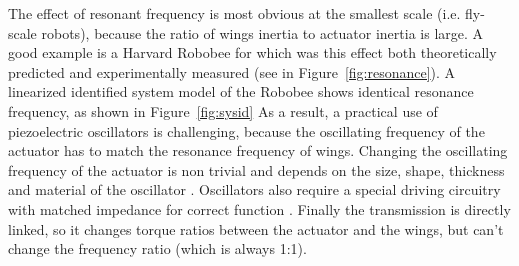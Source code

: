 The effect of resonant frequency is most obvious at the smallest scale (i.e. fly-scale robots), because the ratio of wings inertia to actuator inertia is large. A good example is a Harvard Robobee\cite{Wood2008} for which was this effect both theoretically predicted \cite{Yan2001} and experimentally measured (see in Figure~\ref{fig:resonance}). A linearized identified system model of the Robobee shows identical resonance frequency, as shown in Figure~\ref{fig:sysid}
As a result, a practical use of piezoelectric oscillators is challenging, because the oscillating frequency of the actuator has to match the resonance frequency of wings. Changing the oscillating frequency of the actuator is non trivial and depends on the size, shape, thickness and material of the oscillator \cite{Wood2005}. Oscillators also require a special driving circuitry with matched impedance for correct function \cite{Jafferis2016}. Finally the transmission is directly linked, so it changes torque ratios between the actuator and the wings, but can't change the frequency ratio (which is always 1:1).

